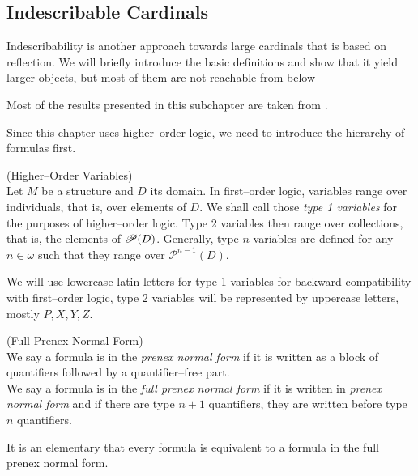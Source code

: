 \subsection{Indescribable Cardinals}

Indescribability is another approach towards large cardinals that is based on reflection. 
We will briefly introduce the basic definitions and show that it yield larger objects, but most of them are not reachable from below

Most of the results presented in this subchapter are taken from \cite{KanamoriBook}.

Since this chapter uses higher–order logic, we need to introduce the hierarchy of formulas first.

\begin{definition}{(Higher–Order Variables)}\label{def:higher_order_variables}\\
Let $M$ be a structure and $D$ its domain. In first–order logic, variables range over individuals, that is, over elements of $D$. We shall call those \emph{type 1 variables} for the purposes of higher–order logic. Type 2 variables then range over collections, that is, the elements of $\mathscr{P} (D)$. Generally, type $n$ variables are defined for any $n \in \omega$ such that they range over $\mathscr{P}^{n-1}(D)$.
\end{definition}
We will use lowercase latin letters for type 1 variables for backward compatibility with first–order logic, type 2 variables will be represented by uppercase letters, mostly $P, X, Y, Z$. 

\begin{definition}{(Full Prenex Normal Form)}\label{def:pnf}\\
We say a formula is in the \emph{prenex normal form} if it is written as a block of quantifiers followed by a quantifier–free part.\\
We say a formula is in the \emph{full prenex normal form} if it is written in \emph{prenex normal form} and if there are type $n+1$ quantifiers, they are written before type $n$ quantifiers.
\end{definition}
It is an elementary that every formula is equivalent to a formula in the full prenex normal form.


